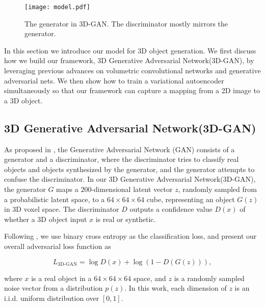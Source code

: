\documentclass{article}
\newcommand{\modelfull}{3D Generative Adversarial Network\xspace}
\newcommand{\model}{3D-GAN\xspace}
\newcommand{\presubsection}{\vspace{-8pt}}
\newcommand{\postsubsection}{\vspace{-6pt}}
\begin{document}
\begin{figure}[t]
\centering
\vspace{-5pt}
\texttt{[image: model.pdf]}
\vspace{-8pt}
\caption{The generator in \model. The discriminator mostly mirrors the generator. }
\vspace{-18pt}
\label{fig:model}
\end{figure}

In this section we introduce our model for 3D object generation. We first discuss how we build our framework, \modelfull (\model), by leveraging previous advances on volumetric convolutional networks and generative adversarial nets. We then show how to train a variational autoencoder~\citep{kingma2014auto} simultaneously so that our framework can capture a mapping from a 2D image to a 3D object. 

\presubsection
\subsection{\modelfull (\model)}
\label{sec:gan}
\postsubsection

As proposed in \cite{goodfellow2014generative}, the Generative Adversarial Network (GAN) consists of a generator and a discriminator, where the discriminator tries to classify real objects and objects synthesized by the generator, and the generator attempts to confuse the discriminator. In our \modelfull (\model), the generator $G$ maps a $200$-dimensional latent vector $z$, randomly sampled from a probabilistic latent space, to a $64\times 64\times 64$ cube, representing an object $G(z)$ in 3D voxel space. The discriminator $D$ outputs a confidence value $D(x)$ of whether a 3D object input $x$ is real or synthetic. 

Following \cite{goodfellow2014generative}, we use binary cross entropy as the classification loss, and present our overall adversarial loss function as 

\vspace{-10pt}
\begin{equation}
\label{eq:ganloss}
L_{\text{\model}}=\log D(x) + \log (1-D(G(z))),
\end{equation}
\vspace{-9pt}

where $x$ is a real object in a $64\times 64\times 64$ space, and $z$ is a randomly sampled noise vector from a distribution $p(z)$. In this work, each dimension of $z$ is an i.i.d. uniform distribution over $[0,1]$. 
\end{document}
